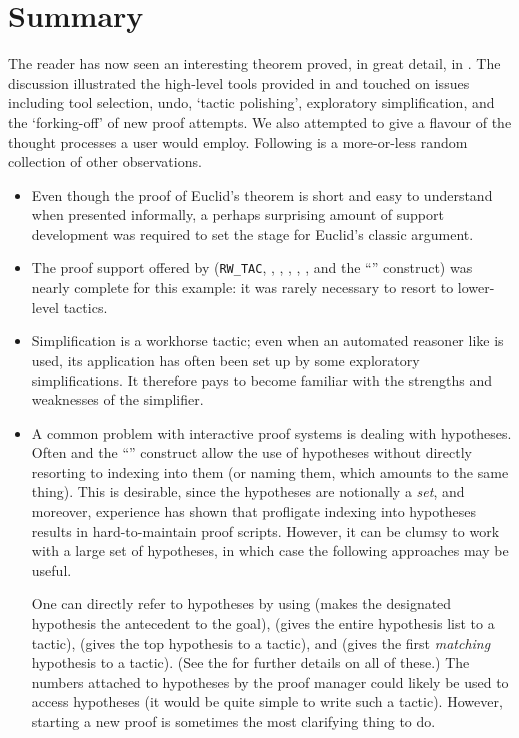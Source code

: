 \section{Summary}

The reader has now seen an interesting theorem proved, in great detail,
in \holn{}. The discussion illustrated the high-level tools provided in
 and touched on issues including tool selection, undo,
`tactic polishing', exploratory simplification, and the `forking-off' of
new proof attempts. We also attempted to give a flavour of the thought
processes a user would employ. Following is a more-or-less random
collection of other observations.
\begin{itemize}

\item Even though the proof of Euclid's theorem is short and easy to
understand when presented informally, a perhaps surprising amount of
support development was required to set the stage for Euclid's classic
argument.

\item The proof support offered by 
(\verb+RW_TAC+, , , ,
, , and the ``'' construct) was
nearly complete for this example: it was rarely necessary to resort to
lower-level tactics.

\item Simplification is a workhorse tactic; even when an automated
reasoner like  is used, its application has often been
set up by some exploratory simplifications. It therefore pays to become
familiar with the strengths and weaknesses of the simplifier.

\item A common problem with interactive proof systems is dealing with
hypotheses. Often  and the ``'' construct allow
the use of hypotheses without directly resorting to indexing into them
(or naming them, which amounts to the same thing). This is desirable,
since the hypotheses are notionally a {\it set}, and moreover,
experience has shown that profligate indexing into hypotheses results in
hard-to-maintain proof scripts. However, it can be clumsy to work with a
large set of hypotheses, in which case the following approaches may be
useful.

One can directly refer to hypotheses by using  (makes
the designated hypothesis the antecedent to the goal),
 (gives the entire hypothesis list to a tactic),
 (gives the top hypothesis to a tactic), and
 (gives the first {\it matching\/} hypothesis to a
tactic). (See the \REFERENCE{} for further details on all of these.)
The numbers attached to hypotheses by the proof manager could likely
be used to access hypotheses (it would be quite simple to write such a
tactic). However, starting a new proof is sometimes the most
clarifying thing to do.


\end{itemize}
